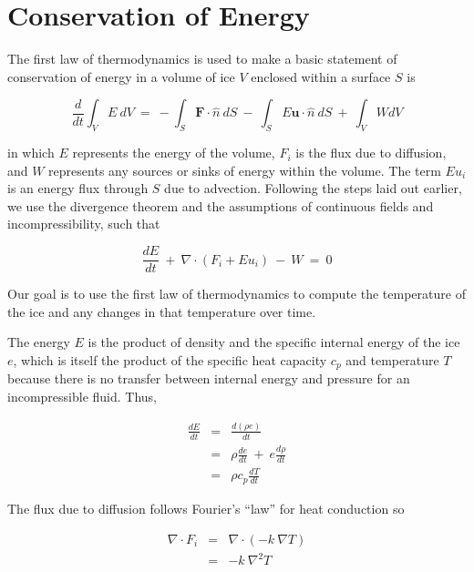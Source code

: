\section{Conservation of Energy}

The first law of thermodynamics is used to make a basic statement of conservation of energy in a volume of ice $V$ enclosed within a surface $S$ is

\begin{equation}
\frac{d}{d t} \int_{V}E ~dV~=~- \int_{S}\mathbf{F}\cdot \hat{n}~dS~-~\int_{S}E \mathbf{u}\cdot \hat{n}~dS~+~\int_{V}W dV
\end{equation}

in which $E$ represents the energy of the volume, $F_{i}$ is the flux due
to diffusion, and $W$ represents any sources or sinks of energy within
the volume. The term $Eu_{i}$ is an energy flux through $S$ due to advection.
Following the steps laid out earlier, we use the divergence theorem and
the assumptions of continuous fields and incompressibility, such that

\begin{equation}
\frac{dE}{dt}~+~\nabla \cdot \left(F_{i} +E u_{i}  \right)~-~W~=~0
\end{equation}

Our goal is to use the first law of thermodynamics to compute the temperature of the ice and any changes in that temperature over time.

The energy $E$ is the product of density and the specific internal
energy of the ice $e$, which is itself the product of the specific heat
capacity $c_{p}$ and temperature $T$ because there is no transfer
between internal energy and pressure for an incompressible fluid. Thus,

\begin{equation}
\begin{matrix}
\frac{dE}{dt}&=&\frac{d\left(\rho e \right)}{dt} \\
&=&\rho\frac{de}{dt}~+~e \frac{d\rho}{dt}\\
&=&\rho c_{p} \frac{dT}{dt}
\end{matrix}
\end{equation}

The flux due to diffusion follows Fourier's ``law'' for heat conduction
so

\begin{equation}
\begin{matrix}
\nabla \cdot F_{i}&=&\nabla \cdot \left( -k ~\nabla T  \right) \\
&=&-k~\nabla^{2}T
\end{matrix}
\end{equation}

